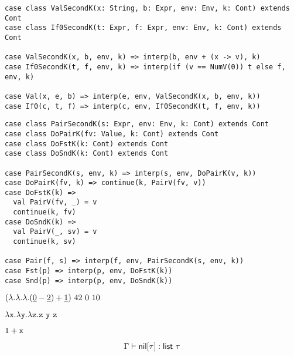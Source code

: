 \textbf{}
\vspace{-1em}
\begin{verbatim}
case class ValSecondK(x: String, b: Expr, env: Env, k: Cont) extends Cont
case class If0SecondK(t: Expr, f: Expr, env: Env, k: Cont) extends Cont

case ValSecondK(x, b, env, k) => interp(b, env + (x -> v), k)
case If0SecondK(t, f, env, k) => interp(if (v == NumV(0)) t else f, env, k)

case Val(x, e, b) => interp(e, env, ValSecondK(x, b, env, k))
case If0(c, t, f) => interp(c, env, If0SecondK(t, f, env, k))
\end{verbatim}

\textbf{}
\vspace{-1em}
\begin{verbatim}
case class PairSecondK(s: Expr, env: Env, k: Cont) extends Cont
case class DoPairK(fv: Value, k: Cont) extends Cont
case class DoFstK(k: Cont) extends Cont
case class DoSndK(k: Cont) extends Cont

case PairSecondK(s, env, k) => interp(s, env, DoPairK(v, k))
case DoPairK(fv, k) => continue(k, PairV(fv, v))
case DoFstK(k) =>
  val PairV(fv, _) = v
  continue(k, fv)
case DoSndK(k) =>
  val PairV(_, sv) = v
  continue(k, sv)

case Pair(f, s) => interp(f, env, PairSecondK(s, env, k))
case Fst(p) => interp(p, env, DoFstK(k))
case Snd(p) => interp(p, env, DoSndK(k))
\end{verbatim}

\textbf{}

$(\lambda.\lambda.\lambda.(\underline{0}-\underline{2})+\underline{1})\ 42\ 0\ 10$
\\

\textbf{}

$\lambda\texttt{x}.\lambda\texttt{y}.\lambda\texttt{z}.\texttt{z}\ \texttt{y}\ \texttt{z}$
\\

\textbf{}

$1+\texttt{x}$
\\

\textbf{}

\[
  \typeofd{\textsf{nil}[\tau]}{\textsf{list}\ \tau}
\]

